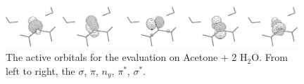 \begin{center}
\begin{figure}[ht]
\begin{center}
\includegraphics[width=11cm]{03_nevpt/images/h2o-active.eps}
\end{center}
\caption{\footnotesize The active orbitals for the evaluation on Acetone + 2
H$_2$O. From left to right, the $\sigma$, $\pi$, $n_y$, $\pi^{*}$,
$\sigma^{*}$. }
\label{fig:h2o-active}
\end{figure}
\end{center}
